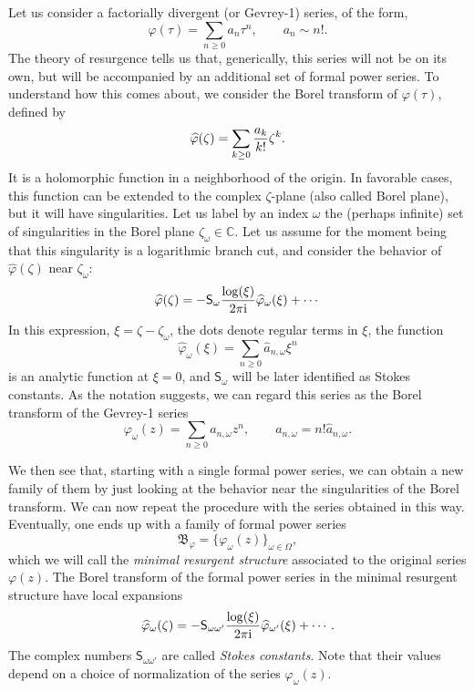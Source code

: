\documentclass[a4paper,11pt]{article}
\theoremstyle{definition}
\def\IC{{\mathbb C}}
\newcommand{\ri}{{\rm i}}
\newcommand{\mS}{\mathsf{S}}
\newcommand{\be}{\begin{equation}}
\newcommand{\ee}{\end{equation}}
\begin{document}
Let us consider a factorially 
divergent (or Gevrey-1) series, of the form, 
%
\begin{equation}
  \varphi(\tau)=\sum_{n \ge 0} a_n \tau^{n},\qquad a_n  \sim n!. 
\end{equation}
%
The theory of resurgence tells us that, generically, this series will not be on its own, 
but will be accompanied by an additional set of 
formal power series. To understand how this comes about, 
we consider the Borel transform of $ \varphi(\tau)$, defined by
%
\begin{equation}
  \widehat \varphi(\zeta)= \sum_{k \ge 0} {a_k \over k!} \zeta^k. 
\end{equation}
%
It is a holomorphic function in a neighborhood of the origin. In
favorable cases, this function can be extended to the complex
$\zeta$-plane (also called Borel plane), but it will have
singularities. Let us label by an index $\omega$ the (perhaps infinite) set 
of singularities in the Borel plane $\zeta_\omega\in \IC$. Let us assume for the moment being
that this singularity is a logarithmic branch cut, and consider the behavior 
of $ \widehat \varphi(\zeta)$ near $\zeta_\omega$: 
%
\be
\label{log-sing}
\widehat \varphi(\zeta)= -\mS_\omega {\log (\xi) \over 2 \pi \ri} \widehat \varphi_\omega (\xi)+ \cdots  
\ee
%
In this expression, $\xi=\zeta- \zeta_\omega$, the dots denote regular terms in $\xi$, the function 
%
\be
 \widehat \varphi_\omega (\xi)= \sum_{n \ge 0} \hat a_{n, \omega} \xi^n
 \ee
 is an analytic function at $\xi=0$, and $\mS_\omega$ will be later identified as Stokes constants. 
 As the notation suggests, we can regard this series as 
 the Borel transform of the Gevrey-1 series
 \be
 \label{phiomco}
 \varphi_\omega(z)=  \sum_{n \ge 0} a_{n, \omega} z^n, \qquad a_{n, \omega}= n! \hat a_{n, \omega}. 
 \ee

 We then see that, starting with a single formal power series, we can obtain a new family of them by just looking at 
 the behavior near the singularities of the Borel 
 transform. We can now repeat the procedure with the series obtained in this way. Eventually, one ends up with a 
family of formal power series
 \be
 \mathfrak{B}_\varphi=\{ \varphi_\omega(z)\}_{\omega \in \Omega}, 
 \ee
 which we will call the {\it minimal resurgent structure} associated to the original series $\varphi(z)$. The Borel transform 
 of the formal power series in the minimal resurgent structure have local expansions 
 \be
 \widehat \varphi_\omega (\zeta)= -\mS_{\omega \omega'} {\log (\xi) \over 2 \pi \ri} \widehat \varphi_{\omega'} (\xi)+ \cdots. 
 \ee
 The complex numbers $\mS_{\omega \omega'}$ are called {\it Stokes constants}. Note that their values depend on a choice of normalization 
 of the series $ \varphi_\omega(z)$. 
 
\end{document}
